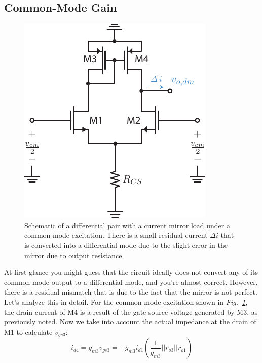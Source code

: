 \subsection{Common-Mode Gain}
\begin{figure}[tb]
\centering
\includegraphics[scale=1]{Diffpair_se_cmgain.pdf}
\caption{Schematic of a differential pair with a current mirror load under a common-mode excitation.  There is a small residual current $\Delta i$ that is converted into a differential mode due to the slight error in the mirror due to output resistance.}
\label{fig:Diffpair_se_cmgain.pdf}
\end{figure}
At first glance you might guess that the circuit ideally does not convert any of its common-mode output to a differential-mode, and you're almost correct.  However, there is a residual mismatch that is due to the fact that the mirror is not perfect.  Let's analyze this in detail.
For the common-mode excitation shown in \emph{Fig.~\ref{fig:Diffpair_se_cmgain.pdf}}, the drain current of M4 is a result of the gate-source voltage generated by M3, as previously noted.  Now we take into account the actual impedance at the drain of M1 to calculate $v_{gs3}$:
    \begin{equation}
        i_{d4} = g_{m3} v_{gs3} = -g_{m3} i_{d1} \left( \frac{1}{g_{m3}} || r_{o3} || r_{o1} \right) 
    \end{equation}
